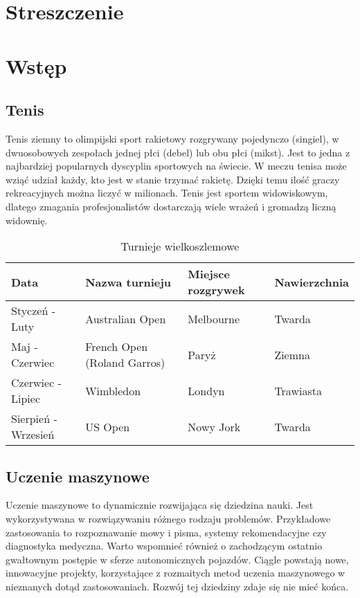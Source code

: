 


\maketitle
\tableofcontents

\chapter{Streszczenie}

\chapter{Wstęp}

\section{Tenis}
Tenis ziemny to olimpijski sport rakietowy rozgrywany pojedynczo (singiel), w dwuosobowych zespołach jednej płci (debel) lub obu płci (mikst). Jest to jedna z najbardziej popularnych dyscyplin sportowych na świecie. W meczu tenisa może wziąć udział każdy, kto jest w stanie trzymać rakietę. Dzięki temu ilość graczy rekreacyjnych można liczyć w milionach. Tenis jest sportem widowiskowym, dlatego zmagania profesjonalistów dostarczają wiele wrażeń i gromadzą liczną widownię. 

\begin{table}[]
\centering
\caption{Turnieje wielkoszlemowe}
\label{my-label}
\begin{tabular}{|l|l|l|l|}
\hline
\textbf{Data}       & \textbf{Nazwa turnieju}     & \textbf{Miejsce rozgrywek} & \textbf{Nawierzchnia} \\ \hline
Styczeń - Luty      & Australian Open             & Melbourne                  & Twarda                \\ \hline
Maj - Czerwiec      & French Open (Roland Garros) & Paryż                      & Ziemna                \\ \hline
Czerwiec - Lipiec   & Wimbledon                   & Londyn                     & Trawiasta             \\ \hline
Sierpień - Wrzesień & US Open                     & Nowy Jork                  & Twarda                \\ \hline
\end{tabular}
\end{table}

\section{Uczenie maszynowe}
Uczenie maszynowe to dynamicznie rozwijająca się dziedzina nauki. Jest wykorzystywana w rozwiązywaniu różnego rodzaju problemów. Przykładowe zastosowania to rozpoznawanie mowy i pisma, systemy rekomendacyjne czy diagnostyka medyczna. Warto wspomnieć również o zachodzącym ostatnio gwałtownym postępie w sferze autonomicznych pojazdów. Ciągle powstają nowe, innowacyjne projekty, korzystające z rozmaitych metod uczenia maszynowego w nieznanych dotąd zastosowaniach. Rozwój tej dziedziny zdaje się nie mieć końca.

